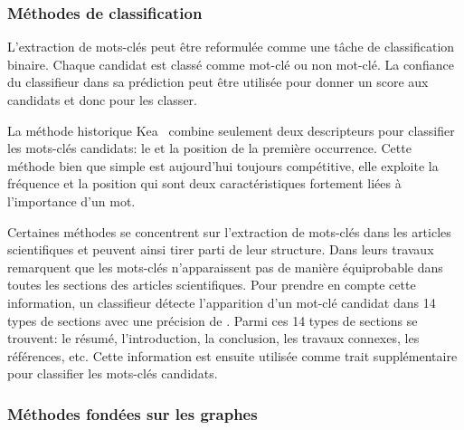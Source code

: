 \subsubsection{Méthodes de classification}\label{classification}

L'extraction de mots-clés peut être reformulée comme une tâche de classification binaire. Chaque candidat est classé comme mot-clé ou non mot-clé. La confiance du classifieur dans sa prédiction peut être utilisée pour donner un score aux candidats et donc pour les classer.


La méthode historique Kea~\cite{witten_kea:_1999} combine seulement deux descripteurs pour classifier les mots-clés candidats: le \tfidf{} et la position de la première occurrence.
Cette méthode bien que simple est aujourd'hui toujours compétitive, elle exploite la fréquence et la position qui sont deux caractéristiques fortement liées à l'importance d'un mot.

Certaines méthodes se concentrent sur l'extraction de mots-clés dans les articles scientifiques et peuvent ainsi tirer parti de leur structure.
Dans leurs travaux \citet{goh_keyphrase_2007} remarquent que les mots-clés n'apparaissent pas de manière équiprobable dans toutes les sections des articles scientifiques.
Pour prendre en compte cette information, un classifieur détecte l'apparition d'un mot-clé candidat dans 14 types de sections avec une précision de .
Parmi ces 14 types de sections se trouvent: le résumé, l'introduction, la conclusion, les travaux connexes, les références, etc.
Cette information est ensuite utilisée comme trait supplémentaire pour classifier les mots-clés candidats.


\subsubsection{Méthodes fondées sur les graphes}\label{graphe}

